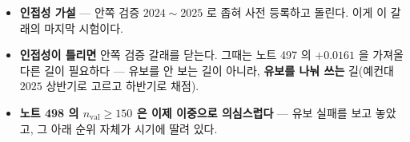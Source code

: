 \documentclass[11pt]{article}
\begin{document}
\begin{itemize}
\item \textbf{인접성 가설} --- 안쪽 검증 $2024\!\sim\!2025$ 로 좁혀
사전 등록하고 돌린다. 이게 이 갈래의 마지막 시험이다.
\item \textbf{인접성이 틀리면} 안쪽 검증 갈래를 닫는다. 그때는 노트 497
의 $+0.0161$ 을 가져올 다른 길이 필요하다 --- 유보를 안 보는 길이
아니라, \textbf{유보를 나눠 쓰는} 길(예컨대 $2025$ 상반기로 고르고
하반기로 채점).
\item \textbf{노트 498 의 $n_{\text{val}} \geq 150$ 은 이제 이중으로
의심스럽다} --- 유보 실패를 보고 놓았고, 그 아래 순위 자체가 시기에 딸려
있다.
\end{itemize}
\end{document}
